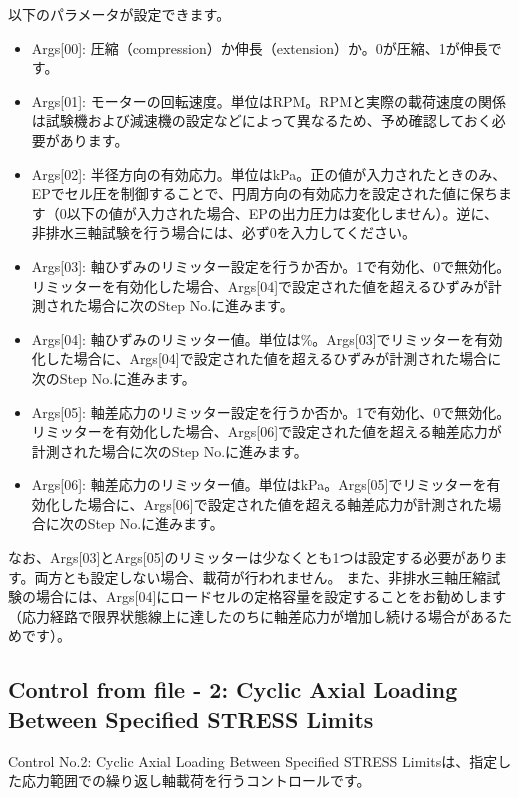 以下のパラメータが設定できます。
\begin{itemize}
    \item Args[00]: 圧縮（compression）か伸長（extension）か。0が圧縮、1が伸長です。
    \item Args[01]: モーターの回転速度。単位はRPM。RPMと実際の載荷速度の関係は試験機および減速機の設定などによって異なるため、予め確認しておく必要があります。
    \item Args[02]: 半径方向の有効応力。単位はkPa。正の値が入力されたときのみ、EPでセル圧を制御することで、円周方向の有効応力を設定された値に保ちます（0以下の値が入力された場合、EPの出力圧力は変化しません）。逆に、非排水三軸試験を行う場合には、必ず0を入力してください。
    \item Args[03]: 軸ひずみのリミッター設定を行うか否か。1で有効化、0で無効化。リミッターを有効化した場合、Args[04]で設定された値を超えるひずみが計測された場合に次のStep No.に進みます。
    \item Args[04]: 軸ひずみのリミッター値。単位は\%。Args[03]でリミッターを有効化した場合に、Args[04]で設定された値を超えるひずみが計測された場合に次のStep No.に進みます。
    \item Args[05]: 軸差応力のリミッター設定を行うか否か。1で有効化、0で無効化。リミッターを有効化した場合、Args[06]で設定された値を超える軸差応力が計測された場合に次のStep No.に進みます。
    \item Args[06]: 軸差応力のリミッター値。単位はkPa。Args[05]でリミッターを有効化した場合に、Args[06]で設定された値を超える軸差応力が計測された場合に次のStep No.に進みます。
\end{itemize}
なお、Args[03]とArgs[05]のリミッターは少なくとも1つは設定する必要があります。両方とも設定しない場合、載荷が行われません。
また、非排水三軸圧縮試験の場合には、Args[04]にロードセルの定格容量を設定することをお勧めします（応力経路で限界状態線上に達したのちに軸差応力が増加し続ける場合があるためです）。

\subsection{Control from file - 2: Cyclic Axial Loading Between Specified STRESS Limits}
Control No.2: Cyclic Axial Loading Between Specified STRESS Limitsは、指定した応力範囲での繰り返し軸載荷を行うコントロールです。

